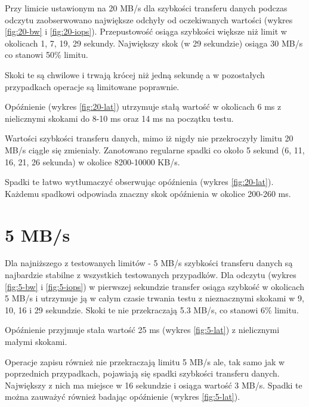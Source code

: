 Przy limicie ustawionym na 20 MB/s dla szybkości transferu danych podczas odczytu zaobserwowano największe odchyły od oczekiwanych wartości
(wykres \ref{fig:20-bw} i \ref{fig:20-iops}).
Przepustowość osiąga szybkości większe niż limit w okolicach 1, 7, 19, 29 sekundy.
Największy skok (w 29 sekundzie) osiąga 30 MB/s co stanowi 50\% limitu.

Skoki te są chwilowe i trwają krócej niż jedną sekundę a w pozostałych przypadkach
operacje są limitowane poprawnie. 

Opóźnienie (wykres \ref{fig:20-lat}) utrzymuje stałą wartość w okolicach 6 ms
z nielicznymi skokami do 8-10 ms oraz 14 ms na początku testu.

Wartości szybkości transferu danych, mimo iż nigdy nie przekroczyły limitu 20 MB/s  ciągle się
zmieniały. Zanotowano regularne spadki co około 5 sekund (6, 11, 16, 21, 26 sekunda)
w okolice 8200-10000 KB/s.

Spadki te łatwo wytłumaczyć obserwując opóźnienia (wykres \ref{fig:20-lat}).
Każdemu spadkowi odpowiada znaczny skok opóźnienia w okolice 200-260 ms.

\section{5 MB/s}

Dla najniższego z testowanych limitów - 5 MB/s szybkości transferu danych 
są najbardzie stabilne z wszystkich testowanych przypadków. Dla odczytu
(wykres \ref{fig:5-bw} i \ref{fig:5-iops}) w pierwszej sekundzie transfer osiąga szybkość w okolicach
5 MB/s i utrzymuje ją w całym czasie trwania testu z nieznacznymi skokami w
9, 10, 16 i 29 sekundzie. Skoki te nie przekraczają 5.3 MB/s, co stanowi 6\%
limitu.

Opóźnienie przyjmuje stała wartość 25 ms (wykres \ref{fig:5-lat}) z nielicznymi
małymi skokami.

Operacje zapisu również
nie przekraczają limitu 5 MB/s ale, tak samo jak w poprzednich przypadkach, pojawiają się spadki
szybkości transferu danych. Największy z nich ma miejsce w 16 sekundzie i osiąga wartość 3 MB/s.
Spadki te można zauważyć również badając opóźnienie (wykres \ref{fig:5-lat}).

